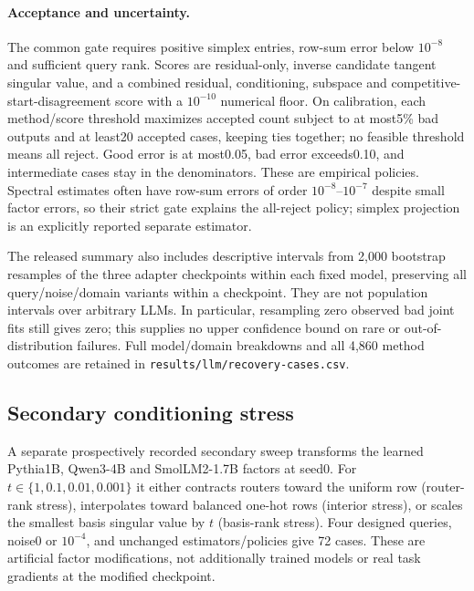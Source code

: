 \paragraph{Acceptance and uncertainty.}
The common gate requires positive simplex entries, row-sum error below
$10^{-8}$ and sufficient query rank. Scores are residual-only,
 inverse candidate tangent singular value, and a combined residual,
 conditioning, subspace and competitive-start-disagreement score with a
$10^{-10}$ numerical floor. On calibration, each method/score threshold
 maximizes accepted count subject to at most5\% bad outputs and at least20
 accepted cases, keeping ties together; no feasible threshold means all
 reject. Good error is at most0.05, bad error exceeds0.10, and intermediate
 cases stay in the denominators. These are empirical policies. Spectral
 estimates often have row-sum errors of order $10^{-8}$--$10^{-7}$ despite
 small factor errors, so their strict gate explains the all-reject policy;
 simplex projection is an explicitly reported separate estimator.



The released summary also includes descriptive intervals from 2,000
 bootstrap resamples of the three adapter checkpoints within each fixed
 model, preserving all query/noise/domain variants within a checkpoint.
They are not population intervals over arbitrary LLMs. In particular,
 resampling zero observed bad joint fits still gives zero; this supplies
 no upper confidence bound on rare or out-of-distribution failures.
Full model/domain breakdowns and all 4,860 method outcomes are retained in
\texttt{results/llm/recovery-cases.csv}.

\subsection{Secondary conditioning stress}

A separate prospectively recorded secondary sweep transforms the learned
Pythia1B, Qwen3-4B and SmolLM2-1.7B factors at seed0. For
$t\in\{1,0.1,0.01,0.001\}$ it either contracts routers toward the uniform
 row (router-rank stress), interpolates toward balanced one-hot rows
 (interior stress), or scales the smallest basis singular value by $t$
 (basis-rank stress). Four designed queries, noise0 or $10^{-4}$, and
 unchanged estimators/policies give 72 cases. These are artificial factor
 modifications, not additionally trained models or real task gradients at
 the modified checkpoint.


